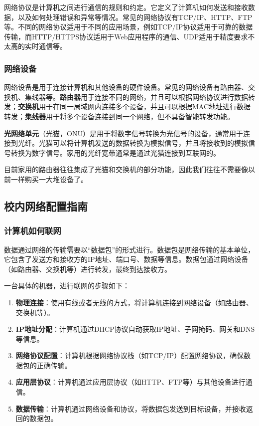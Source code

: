 \documentclass[../main.tex]{subfiles}
\begin{document}
网络协议是计算机之间进行通信的规则和约定。它定义了计算机如何发送和接收数据，以及如何处理错误和异常等情况。常见的网络协议有TCP/IP、HTTP、FTP等。不同的网络协议适用于不同的应用场景，例如TCP/IP协议适用于可靠的数据传输，而HTTP/HTTPS协议适用于Web应用程序的通信、UDP适用于精度要求不太高的实时通信等。

\subsubsection{网络设备}

网络设备是用于连接计算机和其他设备的硬件设备。常见的网络设备有路由器、交换机、集线器等。\textbf{路由器}用于连接不同的网络，并且可以根据网络协议进行数据转发；\textbf{交换机}用于在同一局域网内连接多个设备，并且可以根据MAC地址进行数据转发；\textbf{集线器}用于将多个设备连接到同一个网络，但不具备智能转发功能。

\textbf{光网络单元}（光猫，ONU）是用于将数字信号转换为光信号的设备，通常用于连接到光纤。光猫可以将计算机发送的数据转换为模拟信号，并且将接收到的模拟信号转换为数字信号。家用的光纤宽带通常是通过光猫连接到互联网的。

目前家用的路由器往往集成了光猫和交换机的部分功能，因此我们往往不需要像以前一样购买一大堆设备了。

\subsection{校内网络配置指南}

\subsubsection{计算机如何联网}

数据通过网络的传输需要以“数据包”的形式进行。数据包是网络传输的基本单位，它包含了发送方和接收方的IP地址、端口号、数据等信息。数据包通过网络设备（如路由器、交换机等）进行转发，最终到达接收方。

一台具体的机器，进行联网的步骤如下：
\begin{enumerate}
  \item \textbf{物理连接}：使用有线或者无线的方式，将计算机连接到网络设备（如路由器、交换机等）。
  \item \textbf{IP地址分配}：计算机通过DHCP协议自动获取IP地址、子网掩码、网关和DNS等信息。
  \item \textbf{网络协议配置}：计算机根据网络协议栈（如TCP/IP）配置网络协议，确保数据包的正确传输。
  \item \textbf{应用层协议}：计算机通过应用层协议（如HTTP、FTP等）与其他设备进行通信。
  \item \textbf{数据传输}：计算机通过网络设备和协议，将数据包发送到目标设备，并接收返回的数据包。
\end{enumerate}
\end{document}
